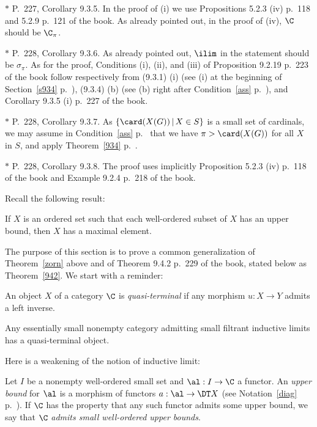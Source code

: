 \documentclass[12pt]{article}
\theoremstyle{remark}
\theoremstyle{definition}
\begin{document}
\nn$*$ P.~227, Corollary 9.3.5. In the proof of (i) we use Propositions 5.2.3 (iv) p.~118 and 5.2.9 p.~121 of the book. As already pointed out, in the proof of (iv), $\C$ should be $\C_\pi$. 

\nn$*$ P.~228, Corollary 9.3.6. As already pointed out, $\ilim$ in the statement should be $\sigma_\pi$. As for the proof, Conditions (i), (ii), and (iii) of Proposition 9.2.19 p.~223 of the book follow respectively from (9.3.1) (i) (see (i) at the beginning of Section~\ref{s934} p.~), (9.3.4) (b) (see (b) right after Condition~\ref{ass} p.~), and Corollary 9.3.5 (i) p.~227 of the book. 

\nn$*$ P.~228, Corollary 9.3.7. As $\{\card(X(G))\,|\,X\in S\}$ is a small set of cardinals, we may assume in Condition~\ref{ass} p.~ that we have $\pi>\card(X(G))$ for all $X$ in $S$, and apply Theorem~\ref{934} p.~. 

\nn$*$ P.~228, Corollary 9.3.8. The proof uses implicitly Proposition 5.2.3 (iv) p.~118 of the book and Example 9.2.4 p.~218 of the book. 



Recall the following result:

\begin{thm}
If $X$ is an ordered set such that each well-ordered subset of $X$ has an upper bound, then $X$ has a maximal element.
\end{thm}

The purpose of this section is to prove a common generalization of Theorem~\ref{zorn} above and of Theorem 9.4.2 p.~229 of the book, stated below as Theorem~\ref{942}. We start with a reminder:

\begin{df} 
An object $X$ of a category $\C$ is {\em quasi-terminal} if any morphism $u:X\to Y$ admits a left inverse.
\end{df}

\begin{thm}[Theorem 9.4.2 p.~229] 
Any essentially small nonempty category admitting small filtrant inductive limits has a quasi-terminal object.
\end{thm}

Here is a weakening of the notion of inductive limit:

\begin{df} 
Let $I$ be a nonempty well-ordered small set and $\al:I\to\C$ a functor. An {\em upper bound} for $\al$ is a morphism of functors $a:\al\to\DT X$ (see Notation~\ref{diag} p.~). If $\C$ has the property that any such functor admits some upper bound, we say that $\C$ {\em admits small well-ordered upper bounds}. 
\end{df}
\end{document}
